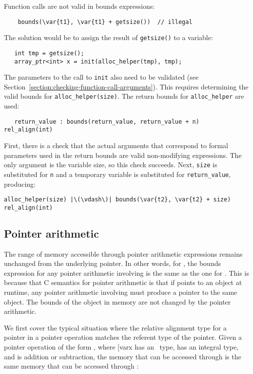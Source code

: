 Function calls are not valid in bounds expressions:

\begin{lstlisting}
    bounds(\var{t1}, \var{t1} + getsize())  // illegal
\end{lstlisting}

The solution would be to assign the result of \lstinline|getsize()| to a
variable:
\begin{lstlisting}
   int tmp = getsize();
   array_ptr<int> x = init(alloc_helper(tmp), tmp);
\end{lstlisting}

The parameters to the call to \lstinline|init| also need to be validated
(see Section~\ref{section:checking-function-call-arguments}). This
requires determining the valid bounds for \lstinline|alloc_helper(size)|. The
return bounds for \lstinline|alloc_helper| are used:
\begin{lstlisting}
   return_value : bounds(return_value, return_value + n) rel_align(int)
\end{lstlisting}

First, there is a check that the actual arguments that correspond to
formal parameters used in the return bounds are valid non-modifying
expressions. The only argument is the variable size, so this check
succeeds. Next, \lstinline|size| is substituted for \lstinline|n| and
a temporary variable is substituted for \lstinline|return_value|, producing:
\begin{lstlisting}[escapechar=\|]
   alloc_helper(size) |\(\vdash\)| bounds(\var{t2}, \var{t2} + size) rel_align(int)
\end{lstlisting}

\subsection{Pointer arithmetic}

The range of memory accessible through pointer arithmetic expressions
remains unchanged from the underlying pointer. In other words, for
, the bounds expression for any
pointer arithmetic involving  is the same as the one for
. This is because that C semantics for pointer arithmetic is
that if  points to an object at runtime, any pointer arithmetic
involving  must produce a pointer to the same object. The bounds
of the object in memory are not changed by the pointer arithmetic.

We first cover the typical situation where the relative alignment type
for a pointer in a pointer operation matches the referent type of the
pointer. Given a pointer operation of the form , where [var{x}
has an \arrayptr\ type,  has an integral type, and
 is addition or subtraction, the memory that can be accessed
through  is the same memory that can be accessed through
:

